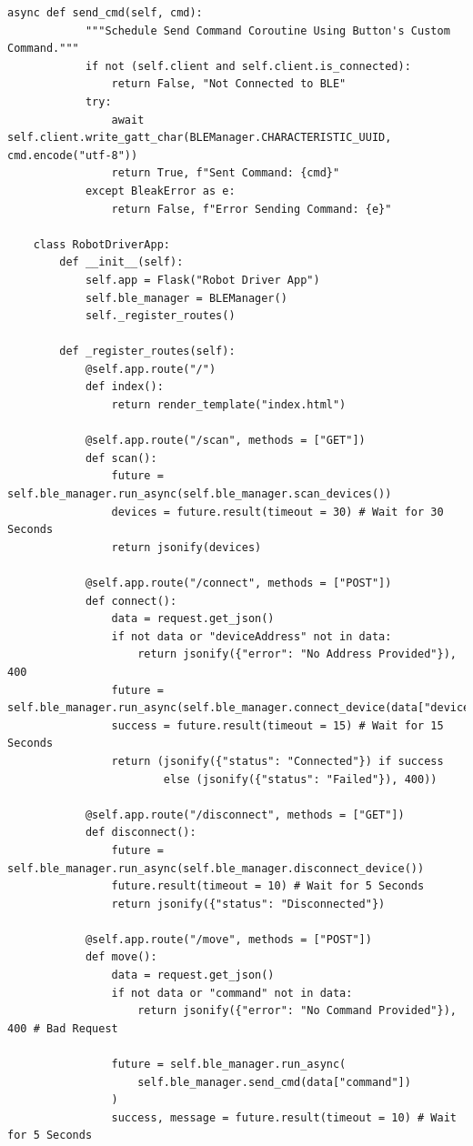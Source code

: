\documentclass{article}
\begin{document}
\begin{lstlisting}[caption={Robot Driver App}, label={lst:driver_app_code}]
        async def send_cmd(self, cmd):
            """Schedule Send Command Coroutine Using Button's Custom Command."""
            if not (self.client and self.client.is_connected):
                return False, "Not Connected to BLE"
            try:
                await self.client.write_gatt_char(BLEManager.CHARACTERISTIC_UUID, cmd.encode("utf-8"))
                return True, f"Sent Command: {cmd}"
            except BleakError as e:
                return False, f"Error Sending Command: {e}"

    class RobotDriverApp:
        def __init__(self):
            self.app = Flask("Robot Driver App")
            self.ble_manager = BLEManager()
            self._register_routes()

        def _register_routes(self):
            @self.app.route("/")
            def index():
                return render_template("index.html")

            @self.app.route("/scan", methods = ["GET"])
            def scan():
                future = self.ble_manager.run_async(self.ble_manager.scan_devices())
                devices = future.result(timeout = 30) # Wait for 30 Seconds
                return jsonify(devices)

            @self.app.route("/connect", methods = ["POST"])
            def connect():
                data = request.get_json()
                if not data or "deviceAddress" not in data:
                    return jsonify({"error": "No Address Provided"}), 400
                future = self.ble_manager.run_async(self.ble_manager.connect_device(data["deviceAddress"]))
                success = future.result(timeout = 15) # Wait for 15 Seconds
                return (jsonify({"status": "Connected"}) if success
                        else (jsonify({"status": "Failed"}), 400))

            @self.app.route("/disconnect", methods = ["GET"])
            def disconnect():
                future = self.ble_manager.run_async(self.ble_manager.disconnect_device())
                future.result(timeout = 10) # Wait for 5 Seconds
                return jsonify({"status": "Disconnected"})

            @self.app.route("/move", methods = ["POST"])
            def move():
                data = request.get_json()
                if not data or "command" not in data:
                    return jsonify({"error": "No Command Provided"}), 400 # Bad Request

                future = self.ble_manager.run_async(
                    self.ble_manager.send_cmd(data["command"])
                )
                success, message = future.result(timeout = 10) # Wait for 5 Seconds


\end{lstlisting}
\end{document}
